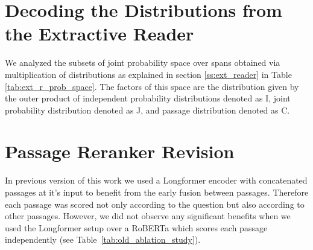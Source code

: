 \documentclass[11pt,a4paper]{article}
\begin{document}
\section{Decoding the Distributions from the Extractive Reader}
\label{app:decoding_ext_probs}
We analyzed the subsets of joint probability space over spans obtained via multiplication of distributions as explained in section \ref{ss:ext_reader} in Table \ref{tab:ext_r_prob_space}. The factors of this space are the distribution given by the outer product of independent probability distributions  denoted as I, joint probability distribution  denoted as J, and passage distribution  denoted as C.
\begin{table}[H]

    \caption{The results of extractive reader with different types of distribution used for decoding. See text for details.}
    \label{tab:ext_r_prob_space}
\end{table}

\section{Passage Reranker Revision}
In previous version of this work we used a Longformer encoder \cite{Beltagy2020Longformer} with concatenated passages at it's input to benefit from the early fusion between passages. Therefore each passage was scored not only according to the question but also according to other passages. However, we did not observe any significant benefits when we used the Longformer setup over a RoBERTa which scores each passage independently (see Table~\ref{tab:old_ablation_study}). 
\end{document}
